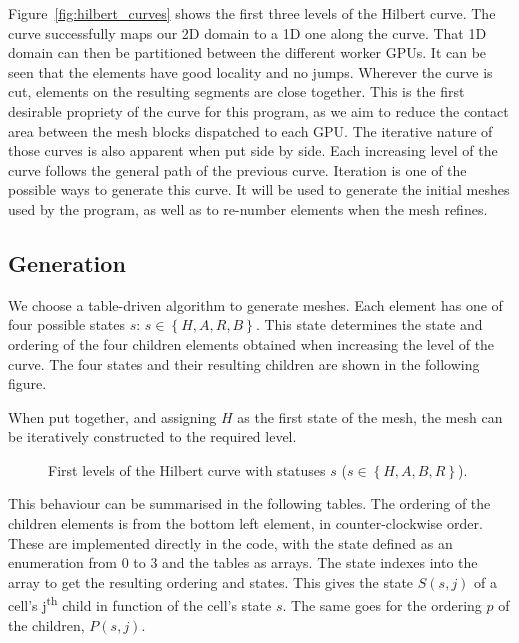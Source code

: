 Figure~\ref{fig:hilbert_curves} shows the first three levels of the Hilbert curve. The curve
successfully maps our 2D domain to a 1D one along the curve. That 1D domain can then be partitioned
between the different worker GPUs. It can be seen that the elements have good locality and no jumps. 
Wherever the curve is cut, elements on the resulting segments are close together. This is the first 
desirable propriety of the curve for this program, as we aim to reduce the contact area between 
the mesh blocks dispatched to each GPU. The iterative nature of those curves is also apparent when
put side by side. Each increasing level of the curve follows the general path of the previous curve.
Iteration is one of the possible ways to generate this curve. It will be used to generate the
initial meshes used by the program, as well as to re-number elements when the mesh refines.

\subsection{Generation} \label{section:load_balancing:hilbert_curve:generation}
We choose a table-driven algorithm to generate meshes. Each element has one of four possible states
$s$: $s \in \left \{H, A, R, B \right \}$. This state determines the state and ordering of the four children
elements obtained when increasing the level of the curve. The four states and their resulting
children are shown in the following figure.


When put together, and assigning $H$ as the first state of the mesh, the mesh can be iteratively
constructed to the required level.

\begin{figure}[H]
	\centering
	\subfloat[Level 0]
	{ \label{fig:hilbert_l0}}
	\hfill
	\subfloat[Level 1]
	{ \label{fig:hilbert_l1}}
	\hfill
	\subfloat[Level 2]
	{ \label{fig:hilbert_l2}}
	\caption{First levels of the Hilbert curve with statuses $s$ ($s \in \left \{ H, A , B , R \right \}$).}
	\label{fig:hilbert_levels}
\end{figure}

This behaviour can be summarised in the following tables. The ordering of the children elements is
from the bottom left element, in counter-clockwise order. These are implemented directly in the
code, with the state defined as an enumeration from 0 to 3 and the tables as arrays. The state
indexes into the array to get the resulting ordering and states. This gives the state $S(s, j)$ of a
cell's j\textsuperscript{th} child in function of the cell's state $s$. The same goes for the
ordering $p$ of the children, $P(s, j)$.

